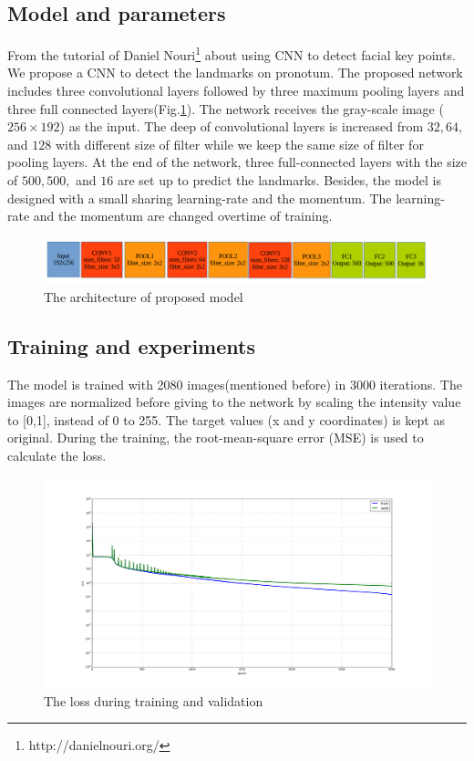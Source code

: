 \documentclass[12pt,a4paper]{article}
\begin{document}
\subsection{Model and parameters}
From the tutorial of Daniel Nouri\footnote{http://danielnouri.org/} about using CNN to detect facial key points. We propose a CNN to detect the landmarks on pronotum. The proposed network includes three convolutional layers followed by three maximum pooling layers and three full connected layers(Fig.\ref{pmodel}). The network receives the gray-scale image ($256 \times 192$) as the input. The deep of convolutional layers is increased from $32, 64, $ and $ 128$ with different size of filter while we keep the same size of filter for pooling layers. At the end of the network, three full-connected layers with the size of $500, 500, $ and $16$ are set up to predict the landmarks. Besides, the model is designed with a small sharing learning-rate and the momentum. The learning-rate and the momentum are changed overtime of training.
\begin{figure}[h!]
	\centering
	\includegraphics[scale=0.4]{images/proposed_model}
	\caption{The architecture of proposed model}
	\label{pmodel}
\end{figure}
\subsection{Training and experiments}
The model is trained with 2080 images(mentioned before) in 3000 iterations. The images are normalized before giving to the network by scaling the intensity value to [0,1], instead of 0 to 255. The target values (x and y coordinates) is kept as original. During the training, the root-mean-square error (MSE) is used to calculate the loss.
\begin{figure}[h!]
	\centering
	\includegraphics[scale=0.25]{images/figure_1_loss_cnn3_3000_2}
	\caption{The loss during training and validation}
	\label{cnn3l}
\end{figure}
\end{document}
